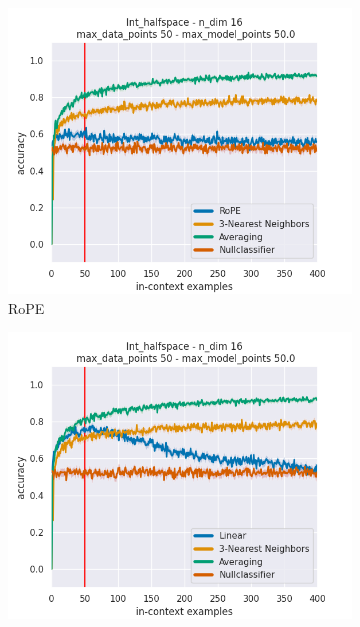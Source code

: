 \documentclass[letterpaper]{article} %
\begin{document}
\begin{figure}[tp]
\begin{subfigure}[t]{0.32\linewidth}
    \end{subfigure}
    \\
    \begin{subfigure}[t]{0.32\linewidth}
        \includegraphics[width=\linewidth]{AnonymousSubmission/LaTeX/imgs/appendix/halfspace/rope.png}
        \caption{RoPE}
    \end{subfigure}
    \begin{subfigure}[t]{0.32\linewidth}
        \includegraphics[width=\linewidth]{AnonymousSubmission/LaTeX/imgs/appendix/halfspace/linear.png}

\end{subfigure}
\end{figure}
\end{document}
